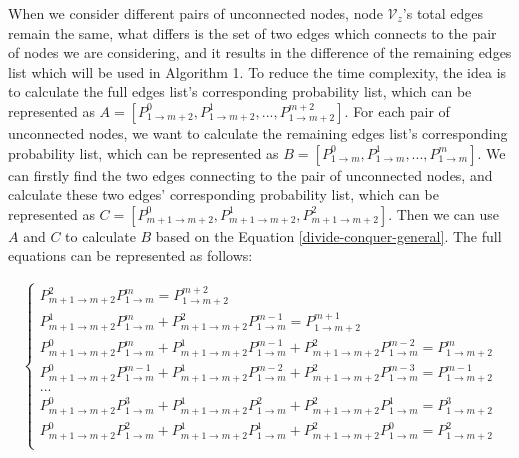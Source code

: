 \documentclass[\main/thesis.tex]{subfiles}
\begin{document}
When we consider different pairs of unconnected nodes, node $\mathcal{V}_z$'s total edges remain the same, what differs is the set of two edges which connects to the pair of nodes we are considering, and it results in the difference of the remaining edges list which will be used in Algorithm 1. To reduce the time complexity, the idea is to calculate the full edges list's corresponding probability list, which can be represented as $A = [P_{1\rightarrow m+2}^0, P_{1\rightarrow m+2}^1, ..., P_{1\rightarrow m+2}^{m+2}]$. For each pair of unconnected nodes, we want to calculate the remaining edges list's corresponding probability list, which can be represented as $B = [P_{1\rightarrow m}^0, P_{1\rightarrow m}^1, ..., P_{1\rightarrow m}^{m}]$. We can firstly find the two edges connecting to the pair of unconnected nodes, and calculate these two edges' corresponding probability list, which can be represented as $C = [P_{m+1\rightarrow m+2}^0, P_{m+1\rightarrow m+2}^1, P_{m+1\rightarrow m+2}^2]$. Then we can use $A$ and $C$ to calculate $B$ based on the Equation \ref{divide-conquer-general}. The full equations can be represented as follows:

\begin{align*}
\left\{
\begin{aligned}
P_{m+1\rightarrow m+2}^2 P_{1\rightarrow m}^{m} = P_{1\rightarrow m+2}^{m+2}\\
P_{m+1\rightarrow m+2}^1 P_{1\rightarrow m}^{m} + P_{m+1\rightarrow m+2}^2 P_{1\rightarrow m}^{m-1} = P_{1\rightarrow m+2}^{m+1}\\
P_{m+1\rightarrow m+2}^0 P_{1\rightarrow m}^{m} + P_{m+1\rightarrow m+2}^1 P_{1\rightarrow m}^{m-1} + P_{m+1\rightarrow m+2}^2 P_{1\rightarrow m}^{m-2} = P_{1\rightarrow m+2}^{m}\\
P_{m+1\rightarrow m+2}^0 P_{1\rightarrow m}^{m-1} + P_{m+1\rightarrow m+2}^1 P_{1\rightarrow m}^{m-2} + P_{m+1\rightarrow m+2}^2 P_{1\rightarrow m}^{m-3} = P_{1\rightarrow m+2}^{m-1}\\
...\\
P_{m+1\rightarrow m+2}^0 P_{1\rightarrow m}^{3} + P_{m+1\rightarrow m+2}^1 P_{1\rightarrow m}^{2} + P_{m+1\rightarrow m+2}^2 P_{1\rightarrow m}^{1} = P_{1\rightarrow m+2}^3\\
P_{m+1\rightarrow m+2}^0 P_{1\rightarrow m}^{2} + P_{m+1\rightarrow m+2}^1 P_{1\rightarrow m}^{1} + P_{m+1\rightarrow m+2}^2 P_{1\rightarrow m}^{0} = P_{1\rightarrow m+2}^2\\
\end{aligned}
\right.
\end{align*}
\end{document}
